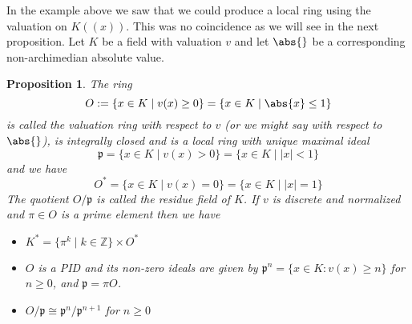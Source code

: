 \documentclass{article}
\newtheorem{proposition}{Proposition}[section]
\newcommand{\mfrak}[1]{\mathfrak{#1}}
\newcommand{\mbb}[1]{\mathbb{#1}}
\numberwithin{equation}{section}
\begin{document}
In the example above we saw that we could produce a local ring using the valuation on $K((x))$. This was no coincidence as we will see in the next proposition. Let $K$ be a field with valuation $v$ and let $\abs{}$ be a corresponding non-archimedian absolute value.

\begin{proposition}\label{prop: Valuation ring of a field}
    The ring
    $$O := \{x \in K \mid  v(x) \geq 0 \} = \{x \in K \mid  \abs{x} \leq 1 \}$$
    is called the valuation ring with respect to $v$ (or we might say with respect to $\abs{}$), is integrally closed and is a local ring with unique maximal ideal
    $$\mfrak p = \{x \in K \mid v(x) > 0 \} = \{x \in K \mid |x| < 1 \}$$
    and we have
    $$O^* = \{x \in K \mid v(x) = 0 \} = \{x \in K \mid |x| = 1 \}$$
    The quotient $O / \mfrak p$ is called the residue field of $K$. If $v$ is discrete and normalized and $\pi \in O$ is a prime element then we have
    \begin{itemize}
        \item $K^* = \{\pi^k \mid k \in \mbb Z \} \times O^*$
        \item $O$ is a PID and its non-zero ideals are given by
              $\mfrak p^n = \{x \in K : v(x) \geq n \}$
              for $n \geq 0$, and $\mfrak p = \pi O$.
        \item $O / \mfrak p \cong \mfrak p^n / \mfrak p^{n+1}$ for $n \geq 0$
    \end{itemize}
\end{proposition}
\end{document}
